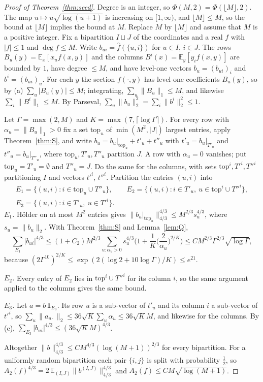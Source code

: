 \documentclass[11pt]{amsart}
\theoremstyle{definition}
\newcommand{\E}{\mathbb{E}}
\newcommand{\hf}{\widehat f}
\begin{document}
\begin{proof}[Proof of Theorem~\ref{thm:seed}]
Degree is an integer, so $\Phi(M,2)=\Phi(\lfloor M\rfloor,2)$. The map $u\mapsto u\sqrt{\log(u+1)}$ is increasing on $[1,\infty)$, and $\lfloor M\rfloor\le M$, so the bound at $\lfloor M\rfloor$ implies the bound at $M$. Replace $M$ by $\lfloor M\rfloor$ and assume that $M$ is a positive integer. Fix a bipartition $I\sqcup J$ of the coordinates and a real $f$ with $|f|\le1$ and $\deg f\le M$. Write $b_{ui}=\hf(\{u,i\})$ for $u\in I$, $i\in J$. The rows $B_u(y)=\E_x[x_uf(x,y)]$ and the columns $B^i(x)=\E_y[y_if(x,y)]$ are bounded by $1$, have degree $\le M$, and have level-one vectors $b_u=(b_{ui})_i$ and $b^i=(b_{ui})_u$. For each $y$ the section $f(\cdot,y)$ has level-one coefficients $B_u(y)$, so by (a) $\sum_u|B_u(y)|\le M$; integrating, $\sum_u\|B_u\|_1\le M$, and likewise $\sum_i\|B^i\|_1\le M$. By Parseval, $\sum_u\|b_u\|_2^2=\sum_i\|b^i\|_2^2\le1$.

Let $\Gamma=\max(2,M)$ and $K=\max(7,\lceil\log \Gamma\rceil)$. For every row with $\alpha_u=\|B_u\|_1>0$ fix a set $\mathrm{top}_u$ of $\min(M^2,|J|)$ largest entries, apply Theorem~\ref{thm:S}, and write $b_u=b_u|_{\mathrm{top}_u}+t'_u+t''_u$ with $t'_u=b_u|_{T'_u}$ and $t''_u=b_u|_{T''_u}$, where $\mathrm{top}_u,T'_u,T''_u$ partition $J$. A row with $\alpha_u=0$ vanishes; put $\mathrm{top}_u=T'_u=\emptyset$ and $T''_u=J$. Do the same for the columns, with sets $\mathrm{top}^i,T'^i,T''^i$ partitioning $I$ and vectors $t'^i$, $t''^i$. Partition the entries $(u,i)$ into
\[
\begin{gathered}E_1=\{(u,i):i\in\mathrm{top}_u\cup T''_u\},\qquad E_2=\{(u,i):i\in T'_u,\ u\in\mathrm{top}^i\cup T''^i\},\\ E_3=\{(u,i):i\in T'_u,\ u\in T'^i\}.\end{gathered}
\]
\emph{$E_1$.} H\"older on at most $M^2$ entries gives $\|b_u|_{\mathrm{top}_u}\|_{4/3}^{4/3}\le M^{2/3}s_u^{4/3}$, where $s_u=\|b_u\|_2$. With Theorem~\ref{thm:S} and Lemma~\ref{lem:Q},
\[
\sum_{E_1}|b_{ui}|^{4/3}\le(1+C_2)M^{2/3}\sum_{u:\alpha_u>0}s_u^{4/3}\Big(1+\frac1K\Big(\frac2{\alpha_u}\Big)^{2/K}\Big)\le CM^{2/3}\Gamma^{2/3}\sqrt{\log \Gamma},
\]
because $(2\Gamma^{10})^{2/K}\le\exp(2(\log2+10\log \Gamma)/K)\le e^{21}$.

\emph{$E_2$.} Every entry of $E_2$ lies in $\mathrm{top}^i\cup T''^i$ for its column $i$, so the same argument applied to the columns gives the same bound.

\emph{$E_3$.} Let $a=b\,\mathbf 1_{E_3}$. Its row $u$ is a sub-vector of $t'_u$ and its column $i$ a sub-vector of $t'^i$, so $\sum_u\|a_{u\cdot}\|_2\le36\sqrt K\sum_u\alpha_u\le36\sqrt KM$, and likewise for the columns. By (c), $\sum_{E_3}|b_{ui}|^{4/3}\le(36\sqrt KM)^{4/3}$.

Altogether $\|b\|_{4/3}^{4/3}\le CM^{4/3}(\log(M+1))^{2/3}$ for every bipartition. For a uniformly random bipartition each pair $\{i,j\}$ is split with probability $\frac12$, so $A_2(f)^{4/3}=2\,\E_{(I,J)}\|b^{(I,J)}\|_{4/3}^{4/3}$ and $A_2(f)\le CM\sqrt{\log(M+1)}$.
\end{proof}
\end{document}
